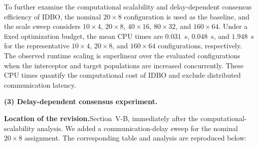 \documentclass[11pt]{article}
\newcommand{\hladd}[1]{{\color{addblue}#1}}
\newcommand{\loc}{\medskip\noindent\textbf{Location of the revision.}\quad}
\begin{document}
\begin{tcolorbox}[enhanced,breakable,colback=white,colframe=addblue!55,
boxrule=0.6pt,arc=2pt,left=9pt,right=9pt,top=7pt,bottom=7pt]
\hladd{To further examine the computational scalability and delay-dependent
consensus efficiency of IDBO, the nominal $20\times8$ configuration is used
as the baseline, and the scale sweep considers $10\times4$, $20\times8$,
$40\times16$, $80\times32$, and $160\times64$. Under a fixed optimization
budget, the mean CPU times are $0.031$~s, $0.048$~s, and $1.948$~s for the
representative $10\times4$, $20\times8$, and $160\times64$ configurations,
respectively. The observed runtime scaling is superlinear over the evaluated
configurations when the interceptor and target populations are increased
concurrently. These CPU times quantify the computational cost of IDBO and
exclude distributed communication latency.}
\end{tcolorbox}

\medskip
\noindent\textbf{(3) Delay-dependent consensus experiment.}

\loc Section~V-B, immediately after the computational-scalability analysis.
We added a communication-delay sweep for the nominal $20\times8$ assignment.
The corresponding table and analysis are reproduced below:
\end{document}
